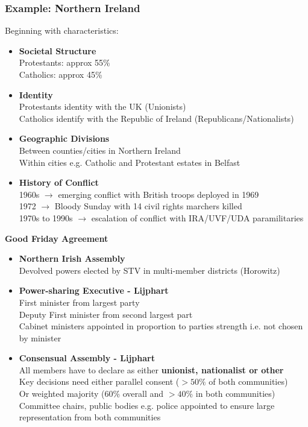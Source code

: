 \documentclass[12pt, letterpaper]{article}
\begin{document}
\subsubsection{Example: Northern Ireland}
Beginning with characteristics:
\begin{itemize}
	\item \textbf{Societal Structure}\\
		Protestants: approx 55\%\\
		Catholics: approx 45\%
	\item \textbf{Identity}\\
		Protestants identity with the UK (Unionists)\\
		Catholics identify with the Republic of Ireland (Republicans/Nationalists)
	\item \textbf{Geographic Divisions}\\
		Between counties/cities in Northern Ireland\\
		Within cities e.g. Catholic and Protestant estates in Belfast
	\item \textbf{History of Conflict}\\
		1960s $\rightarrow$ emerging conflict with British troops deployed in 1969\\
		1972 $\rightarrow$ Bloody Sunday with 14 civil rights marchers killed\\
		1970s to 1990s $\rightarrow$ escalation of conflict with IRA/UVF/UDA paramilitaries
\end{itemize}
\textbf{Good Friday Agreement}
\begin{itemize}
	\item \textbf{Northern Irish Assembly}\\
		Devolved powers elected by STV in multi-member districts (Horowitz)
	\item \textbf{Power-sharing Executive - Lijphart}\\
		First minister from largest party\\
		Deputy First minister from second largest part\\
		Cabinet ministers appointed in proportion to parties strength i.e. not chosen by minister
	\item \textbf{Consensual Assembly - Lijphart}\\
		All members have to declare as either \textbf{unionist, nationalist or other}\\
		Key decisions need either parallel consent ($>50\%$ of both communities)\\
		Or weighted majority (60\% overall and $>40\%$ in both communities)\\
		Committee chairs, public bodies e.g. police appointed to ensure large representation from both communities
\end{itemize}
\end{document}
